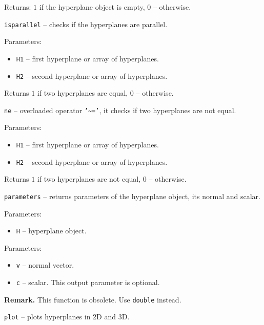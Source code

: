 Returns: $1$ if the hyperplane object is empty, $0$ -- otherwise.

\newpage

{\Large {\tt isparallel}} -- checks if the hyperplanes are parallel.

Parameters:
\begin{itemize}
\item {\tt H1} -- first hyperplane or array of hyperplanes.
\item {\tt H2} -- second hyperplane or array of hyperplanes.
\end{itemize}

Returns $1$ if two hyperplanes are equal, $0$ -- otherwise.



\newpage

{\Large {\tt ne}} -- overloaded operator {\tt '\~{ }='},
it checks if two hyperplanes are not equal.

Parameters:
\begin{itemize}
\item {\tt H1} -- first hyperplane or array of hyperplanes.
\item {\tt H2} -- second hyperplane or array of hyperplanes.
\end{itemize}

Returns $1$ if two hyperplanes are not equal, $0$ -- otherwise.



\newpage

{\Large {\tt parameters}} -- returns parameters of the hyperplane object,
its normal and scalar.

Parameters:
\begin{itemize}
\item {\tt H} -- hyperplane object.
\end{itemize}

Parameters:
\begin{itemize}
\item {\tt v} -- normal vector.
\item {\tt c} -- scalar. This output parameter is optional.
\end{itemize}

{\bf Remark.} This function is obsolete. Use {\tt double} instead.

\newpage

{\Large {\tt plot}} -- plots hyperplanes in 2D and 3D.


